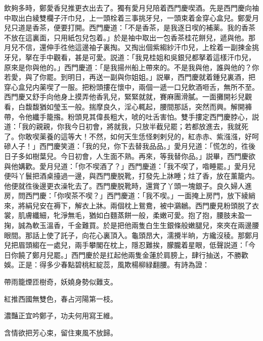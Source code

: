 飲夠多時，鄭愛香兒推更衣出去了。獨有愛月兒陪着西門慶喫酒。先是西門慶向袖中取出白綾雙欄子汗巾兒，上一頭栓着三事挑牙兒，一頭束着金穿心盒兒。鄭愛月兒只道是香茶，便要打開。西門慶道：「不是香茶，是我逐日喫的補薬。我的香茶不放在這裏面，只用紙包兒包着。」於是袖中取出一包香茶桂花餅兒，遞與他。那月兒不信，還伸手徃他這邊袖子裏掏。又掏出個紫縐紗汗巾兒，上栓着一副揀金挑牙兒，拏在手中觀看，甚是可愛。説道：「我見桂姐和吳銀兒都拏着這樣汗巾兒，原來是你與他的。」西門慶道：「是我揚州船上帶來的。不是我與他，誰與他的？你若愛，與了你罷。到明日，再送一副與你姐姐。」説畢，西門慶就着鍾兒裏酒，把穿心盒兒内薬喫了一服。把粉頭摟在懷中，兩個一遞一口兒飲酒咂舌，無所不至。西門慶又舒手向他身上摸弄他香乳兒，緊緊就就，賽麻團滑膩。一面攤開衫兒觀看，白馥馥猶如瑩玉一般。揣摩良久，淫心輒起，腰間那話，突然而興。解開褲帶，令他纖手籠揝。粉頭見其偉長粗大，唬的吐舌害怕。雙手摟定西門慶脖心，説道：「我的親親，你我今日初會，將就我，只放半截兒罷；若都放進去，我就死了。你敢喫薬養的這等大！不然，如何天生恁怪剌剌兒的，紅赤赤、紫漒漒，好呵磣人子！」西門慶笑道：「我的兒，你下去替我品品。」愛月兒道：「慌怎的，徃後日子多如樹葉兒。今日初會，人生面不熟。再來，等我替你品。」説畢，西門慶欲與他媾歡。愛月兒道：「你不喫酒了？」西門慶道：「我不喫了，喒睡罷。」愛月兒便呌丫鬟把酒桌擡過一邊，與西門慶脱靴，打發先上牀睡；炷了香，放在薰籠内。他便就徃後邊更衣澡牝去了。西門慶脱靴時，還賞了丫頭一塊銀子。良久婦人進房，問西門慶：「你喫茶不喫？」西門慶道：「我不喫。」一面掩上房門，放下綾綃來，將絹兒安在褥下，解衣上牀。兩個枕上鴛鴦，被中鸂鶒。西門慶見粉頭脱了衣裳，肌膚纖細，牝淨無毛，猶如白麵蒸餅一般，柔嫩可愛。抱了抱，腰肢未盈一掬，誠為軟玉溫香，千金難買。於是把他兩隻白生生銀條般嫩腿兒，來夾在兩邊腰眼間。那話上使了託子，向花心裏頂入。龜頭昂大，濡攪半晌，方纔沒稜。那鄭月兒把眉頭縐在一處兒，兩手攀閣在枕上，隱忍難挨，朦朧着星眼，低聲説道：「今日你饒了鄭月兒罷。」西門慶於是扛起他兩隻金蓮於肩膀上，肆行抽送，不勝歡娛。正是：得多少春點碧桃紅綻蕊，風欺楊柳緑翻腰。有詩為證：

\begin{myquote}
帶雨籠煙匝樹奇，妖嬈身勢似難支。

紅推西國無雙色，春占河陽第一枝。

濃豔正宜吟鄭子，功夫何用寫王維。

含情欲把芳心束，留住東風不放歸。
\end{myquote}

